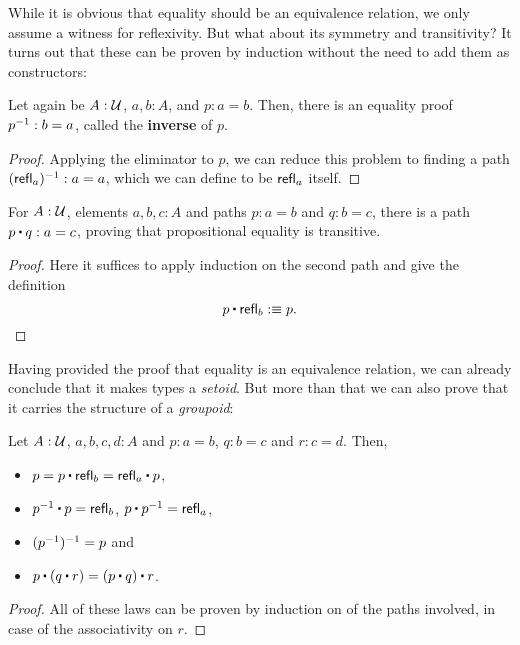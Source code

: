 While it is obvious that equality should be an equivalence relation,
we only assume a witness for reflexivity.
But what about its symmetry and transitivity?
It turns out that these can be proven by induction without the need
to add them as constructors:
\begin{lemma}
Let again be $A : \mathcal{U}$, $a, b : A$, and $p : a = b$.
Then, there is an equality proof $p^{-1} : b = a$, called the \textbf{inverse}
of $p$.
\end{lemma}

\begin{proof}
Applying the eliminator to $p$, we can reduce this problem to finding a path
$(\mathsf{refl}_a)^{-1} : a = a$, which we can define to be $\mathsf{refl}_a$ itself.
\end{proof}

\begin{lemma}
For $A : \mathcal{U}$, elements $a, b, c : A$ and paths $p : a = b$ and $q : b = c$,
there is a path $p \ct q : a = c$, proving that propositional equality is
transitive.
\end{lemma}

\begin{proof}
Here it suffices to apply induction on the second path and give the definition
\begin{equation*}
p \ct \refl_b :\equiv p \text{.}
\end{equation*}
\end{proof}

Having provided the proof that equality is an equivalence relation,
we can already conclude that it makes types a \emph{setoid}.
But more than that we can also prove that it carries the structure of a
\emph{groupoid}:
\begin{lemma}
Let $A : \mathcal{U}$, $a, b, c, d : A$ and $p : a = b$, $q : b = c$ and $r : c = d$.
Then,
\begin{itemize}
\item $p = p \ct \refl_b = \refl_a \ct p$,
\item $p\inv \ct p = \refl_b$, $p \ct p\inv = \refl_a$,
\item $(p^{-1})^{-1} = p$ and
\item $p \ct (q \ct r) = (p \ct q) \ct r$.
\end{itemize}
\end{lemma}

\begin{proof}
All of these laws can be proven by induction on of the paths involved,
in case of the associativity on $r$.
\end{proof}

